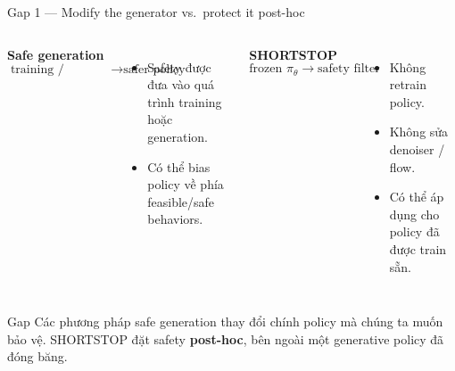 \documentclass[aspectratio=169]{beamer}
\begin{document}
\begin{frame}[t,shrink=8]{Gap 1 --- Modify the generator vs.\ protect it post-hoc}
\begin{columns}[T]

\textbf{Safe generation}
\[
\text{training / sampling}
\rightarrow
\text{safer policy}
\]
\begin{itemize}
    \item Safety được đưa vào quá trình training hoặc generation.
    \item Có thể bias policy về phía feasible/safe behaviors.
\end{itemize}

\textbf{SHORTSTOP}
\[
\text{frozen }\pi_\theta
\rightarrow
\text{safety filter}
\]
\begin{itemize}
    \item Không retrain policy.
    \item Không sửa denoiser / flow.
    \item Có thể áp dụng cho policy đã được train sẵn.
\end{itemize}

\end{columns}
\vspace{6pt}

\begin{alertblock}{Gap}
Các phương pháp safe generation thay đổi chính policy mà chúng ta muốn
bảo vệ. SHORTSTOP đặt safety \textbf{post-hoc}, bên ngoài một
generative policy đã đóng băng.
\end{alertblock}
\end{frame}

\end{document}
